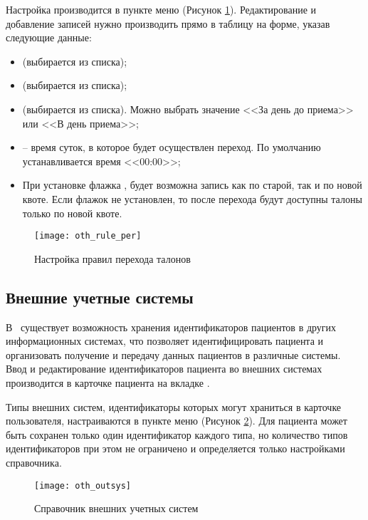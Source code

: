 Настройка производится в пункте меню  (Рисунок \ref{img_oth_rule_per}). Редактирование и добавление записей нужно производить прямо в таблицу на форме, указав следующие данные:
\begin{itemize}
 \item {} (выбирается из списка);
 \item {} (выбирается из списка);
 \item {} (выбирается из списка). Можно выбрать значение <<За день до приема>> или <<В день приема>>;
 \item {} – время суток, в которое будет осуществлен переход. По умолчанию устанавливается время <<00:00>>;
 \item При установке флажка , будет возможна запись как по старой, так и по новой квоте. Если флажок не установлен, то после перехода будут доступны талоны только по новой квоте.
\end{itemize}

\begin{figure}[ht]\centering
 \texttt{[image: oth\_rule\_per]}
 \caption{Настройка правил перехода талонов}
 \label{img_oth_rule_per}
\end{figure}

\subsection{Внешние учетные системы} \label{oth_outsys}

В \tmis~существует возможность хранения идентификаторов пациентов в других информационных системах, что позволяет идентифицировать пациента и организовать получение и передачу данных пациентов в различные системы. Ввод и редактирование идентификаторов пациента во внешних системах производится в карточке пациента на вкладке .

Типы внешних систем, идентификаторы которых могут храниться в карточке пользователя, настраиваются в пункте меню  (Рисунок \ref{img_oth_outsys}). Для пациента может быть сохранен только один идентификатор каждого типа, но количество типов идентификаторов при этом не ограничено и определяется только настройками справочника.

\begin{figure}[ht]\centering
 \texttt{[image: oth\_outsys]}
 \caption{Справочник внешних учетных систем}
 \label{img_oth_outsys}
\end{figure}

